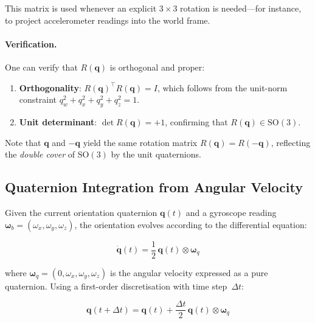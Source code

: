 \noindent This matrix is used whenever an explicit $3\times 3$ rotation is
needed---for instance, to project accelerometer readings into the world
frame.

\paragraph{Verification.}
One can verify that $R(\mathbf{q})$ is orthogonal and proper:
\begin{enumerate}
  \item \textbf{Orthogonality}: $R(\mathbf{q})^\top R(\mathbf{q}) = I$,
    which follows from the unit-norm constraint $q_w^2+q_x^2+q_y^2+q_z^2=1$.
  \item \textbf{Unit determinant}: $\det R(\mathbf{q}) = +1$, confirming
    that $R(\mathbf{q})\in\mathrm{SO}(3)$.
\end{enumerate}

\noindent Note that $\mathbf{q}$ and $-\mathbf{q}$ yield the same
rotation matrix $R(\mathbf{q}) = R(-\mathbf{q})$, reflecting the
\emph{double cover} of $\mathrm{SO}(3)$ by the unit quaternions.

\subsection{Quaternion Integration from Angular Velocity}
\label{sec:quat:integration}

Given the current orientation quaternion $\mathbf{q}(t)$ and a gyroscope
reading $\boldsymbol{\omega}_b = (\omega_x, \omega_y, \omega_z)$, the
orientation evolves according to the differential equation:

\begin{equation}
  \dot{\mathbf{q}}(t) = \frac{1}{2}\,\mathbf{q}(t) \otimes
  \boldsymbol{\omega}_q
  \label{eq:quat_diff}
\end{equation}

\noindent where $\boldsymbol{\omega}_q = (0, \omega_x, \omega_y, \omega_z)$ is
the angular velocity expressed as a pure quaternion. Using a first-order
discretisation with time step~$\Delta t$:

\begin{equation}
  \mathbf{q}(t + \Delta t) = \mathbf{q}(t) + \frac{\Delta t}{2}\,
  \mathbf{q}(t) \otimes \boldsymbol{\omega}_q
  \label{eq:quat_euler}
\end{equation}

